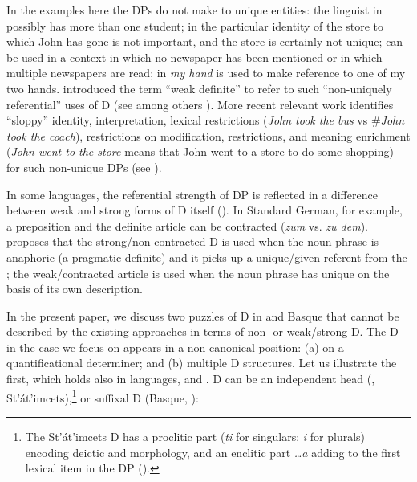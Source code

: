 \documentclass[output=paper,
modfonts
]{langscibook}
\begin{document}
In the examples here the DPs do not make  to unique entities: the linguist in  possibly has more than one student; in  the particular identity of the store to which John has gone is not important, and the store is certainly not unique;  can be used in a context in which no newspaper has been mentioned or in which multiple newspapers are read; in  \textit{my hand} is used to make reference to one of my two hands. \citet{Poesio1994} introduced the term ``weak definite'' to refer to such ``non-uniquely referential'' uses of D (see among others \citealt{CarlsonSussman2005, Schwarz2009, Aguilar-GuevaraZwarsts2011, corblin2013}). More recent relevant work identifies ``sloppy'' identity,  interpretation, lexical restrictions (\textit{John took the bus} vs \#\textit{John took the coach}), restrictions on modification,  restrictions, and meaning enrichment (\textit{John went to the store} means that John went to a store to do some shopping) for such non-unique DPs (see \citealt{CarlsonSussman2005, Aguilar-GuevaraEtAlii2014}).

In some languages, the referential strength of DP is reflected in a difference between weak and strong forms of D itself (\citealt{Cieschinger2006, Waldmuller2008, Schwarz2009}). In Standard German, for example, a preposition and the definite article can be contracted (\textit{zum} vs. \textit{zu dem}). \citet{Schwarz2009} proposes that the strong/non-contracted D is used when the noun phrase is anaphoric (a pragmatic definite) and it picks up a unique/given referent from the ; the weak/contracted article is used when the noun phrase has unique  on the basis of its own description. 

In the present paper, we discuss two puzzles of D in  and Basque that cannot be described by the existing approaches in terms of non- or weak/strong D. The D in the case we focus on appears in a non-canonical position: (a) on a quantificational determiner; and (b) multiple D structures. Let us illustrate the first, which holds also in  languages,  and . D can be an independent head (, St'\'at'imcets),\footnote{The St'\'at'imcets D has a proclitic part (\textit{ti} for singulars; \textit{i} for plurals) encoding deictic and  morphology, and an enclitic part \textit{…a} adding to the first lexical item in the DP (\citealt{matthewson1998}).} or suffixal D (Basque, ): \newpage
\end{document}
